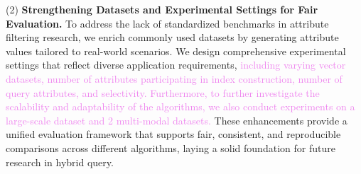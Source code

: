\documentclass[sigconf, nonacm]{acmart}
\begin{document}
	(2) \textbf{Strengthening Datasets and Experimental Settings for Fair Evaluation.}
	To address the lack of standardized benchmarks in attribute filtering research, we enrich commonly used datasets by generating attribute values tailored to real-world scenarios. We design comprehensive experimental settings that reflect diverse application requirements, \textcolor{violet}{including varying vector datasets, number of attributes participating in index construction, number of query attributes, and selectivity. Furthermore, to further investigate the scalability and adaptability of the algorithms, we also conduct experiments on a large-scale dataset and 2 multi-modal datasets.}  These enhancements provide a unified evaluation framework that supports fair, consistent, and reproducible comparisons across different algorithms, laying a solid foundation for future research in hybrid query.


\end{document}
